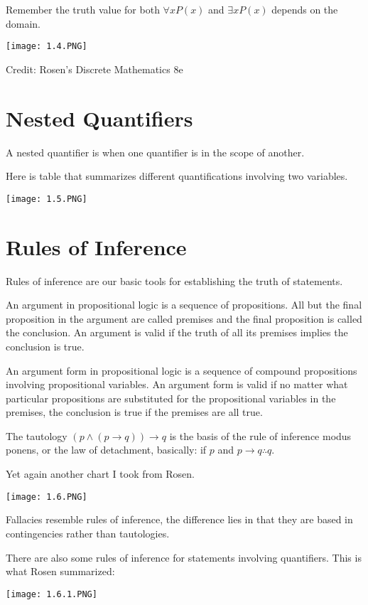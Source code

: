\documentclass[../discrete.tex]{subfiles}
\begin{document}
Remember the truth value for both $\forall x P(x)$ and $\exists x P(x)$ depends on the domain.
\begin{center}
    \texttt{[image: 1.4.PNG]}
\end{center}
Credit: Rosen's Discrete Mathematics 8e

\section{Nested Quantifiers}
A nested quantifier is when one quantifier is in the scope of another.

Here is table that summarizes different quantifications involving two variables.
\begin{center}
    \texttt{[image: 1.5.PNG]}
\end{center}

\section{Rules of Inference}
Rules of inference are our basic tools for establishing the truth of statements.

An argument in propositional logic is a sequence of propositions. All but the final proposition in the 
argument are called premises and the final proposition is called the conclusion. An argument is valid 
if the truth of all its premises implies the conclusion is true.

An argument form in propositional logic is a sequence of compound propositions involving propositional 
variables. An argument form is valid if no matter what particular propositions are substituted for the 
propositional variables in the premises, the conclusion is true if the premises are all true.

The tautology $(p\land(p\rightarrow q))\rightarrow q$ is the basis of the rule of inference 
modus ponens, or the law of detachment, basically: if $p$ and $p\rightarrow q \therefore q$.

Yet again another chart I took from Rosen.
\begin{center}
    \texttt{[image: 1.6.PNG]}
\end{center}

Fallacies resemble rules of inference, the difference lies in that they are based in contingencies rather than tautologies.

There are also some rules of inference for statements involving quantifiers.
This is what Rosen summarized:
\begin{center}
    \texttt{[image: 1.6.1.PNG]}
\end{center}
\end{document}

